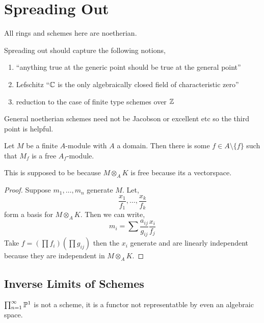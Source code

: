 \documentclass[12pt]{article}
\begin{document}
\section{Spreading Out}

\begin{rmk}
All rings and schemes here are noetherian. 
\end{rmk}

\begin{rmk}
Spreading out should capture the following notions,
\begin{enumerate}
\item ``anything true at the generic point should be true at the general point''
\item Lefschitz ``$\CC$ is the only algebraically closed field of characteristic zero''
\item  reduction to the case of finite type schemes over $\Z$
\end{enumerate}
\end{rmk}

\begin{rmk}
General noetherian schemes need not be Jacobson or excellent etc so the third point is helpful.
\end{rmk}

\begin{prop}
Let $M$ be a finite $A$-module with $A$ a domain. Then there is some $f \in A \setminus \{ f \}$ such that $M_f$ is a free $A_f$-module.
\end{prop}

\begin{rmk}
This is supposed to be because $M \otimes_A K$ is free because its a vectorspace.
\end{rmk}

\begin{proof}
Suppose $m_1, \dots, m_n$ generate $M$. Let,
\[ \frac{x_1}{f_1}, \dots, \frac{x_k}{f_k} \]
form a basis for $M \otimes_A K$. Then we can write,
\[ m_i = \sum \frac{a_{ij}}{g_{ij}} \frac{x_i}{f_j} \]
Take $f = \left( \prod f_i \right) \left( \prod g_{ij} \right)$ then the $x_i$ generate and are linearly independent because they are independent in $M \otimes_A K$.
\end{proof}

\subsection{Inverse Limits of Schemes}

\begin{example}
$\prod^\infty_{n = 1} \P^1$ is not a scheme, it is a functor not representatble by even an algebraic space.
\end{example}
\end{document}
